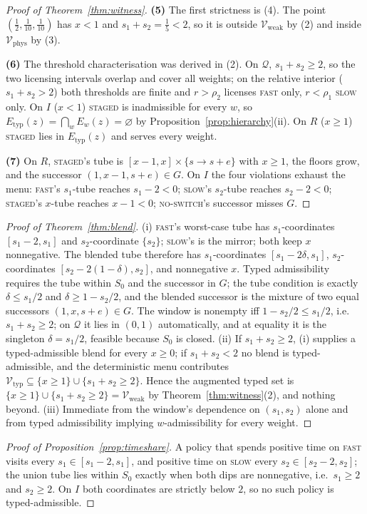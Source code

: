 \documentclass[preprint,11pt,authoryear]{elsarticle}
\theoremstyle{definition}
\theoremstyle{remark}
\newcommand{\Etyp}{E_{\mathrm{typ}}}
\newcommand{\Vtyp}{\mathcal{V}_{\mathrm{typ}}}
\newcommand{\Vweak}{\mathcal{V}_{\mathrm{weak}}}
\newcommand{\Vphys}{\mathcal{V}_{\mathrm{phys}}}
\newcommand{\Q}{\mathcal{Q}}
\newcommand{\act}[1]{\textsc{#1}}
\begin{document}
\begin{proof}[Proof of Theorem~\ref{thm:witness}]
\textbf{(5)} The first strictness is (4). The point $(\tfrac12,\tfrac1{10},\tfrac1{10})$ has $x<1$ and $s_1+s_2=\tfrac15<2$, so it is outside $\Vweak$ by (2) and inside $\Vphys$ by (3).

\textbf{(6)} The threshold characterisation was derived in (2). On $\Q$, $s_1+s_2\ge2$, so the two licensing intervals overlap and cover all weights; on the relative interior ($s_1+s_2>2$) both thresholds are finite and $r>\rho_2$ licenses \act{fast} only, $r<\rho_1$ \act{slow} only. On $I$ ($x<1$) \act{staged} is inadmissible for every $w$, so $\Etyp(z)=\bigcap_wE_w(z)=\varnothing$ by Proposition~\ref{prop:hierarchy}(ii). On $R$ ($x\ge1$) \act{staged} lies in $\Etyp(z)$ and serves every weight.

\textbf{(7)} On $R$, \act{staged}'s tube is $[x-1,x]\times\{s\to s+e\}$ with $x\ge1$, the floors grow, and the successor $(1,x-1,s+e)\in G$. On $I$ the four violations exhaust the menu: \act{fast}'s $s_1$-tube reaches $s_1-2<0$; \act{slow}'s $s_2$-tube reaches $s_2-2<0$; \act{staged}'s $x$-tube reaches $x-1<0$; \act{no-switch}'s successor misses $G$.
\end{proof}

\begin{proof}[Proof of Theorem~\ref{thm:blend}]
(i) \act{fast}'s worst-case tube has $s_1$-coordinates $[s_1-2,s_1]$ and $s_2$-coordinate $\{s_2\}$; \act{slow}'s is the mirror; both keep $x$ nonnegative. The blended tube therefore has $s_1$-coordinates $[s_1-2\delta,s_1]$, $s_2$-coordinates $[s_2-2(1-\delta),s_2]$, and nonnegative $x$. Typed admissibility requires the tube within $S_0$ and the successor in $G$; the tube condition is exactly $\delta\le s_1/2$ and $\delta\ge1-s_2/2$, and the blended successor is the mixture of two equal successors $(1,x,s+e)\in G$. The window is nonempty iff $1-s_2/2\le s_1/2$, i.e.\ $s_1+s_2\ge2$; on $\Q$ it lies in $(0,1)$ automatically, and at equality it is the singleton $\delta=s_1/2$, feasible because $S_0$ is closed.
(ii) If $s_1+s_2\ge2$, (i) supplies a typed-admissible blend for every $x\ge0$; if $s_1+s_2<2$ no blend is typed-admissible, and the deterministic menu contributes $\Vtyp\subseteq\{x\ge1\}\cup\{s_1+s_2\ge2\}$. Hence the augmented typed set is $\{x\ge1\}\cup\{s_1+s_2\ge2\}=\Vweak$ by Theorem~\ref{thm:witness}(2), and nothing beyond.
(iii) Immediate from the window's dependence on $(s_1,s_2)$ alone and from typed admissibility implying $w$-admissibility for every weight.
\end{proof}

\begin{proof}[Proof of Proposition~\ref{prop:timeshare}]
A policy that spends positive time on \act{fast} visits every $s_1\in[s_1-2,s_1]$, and positive time on \act{slow} every $s_2\in[s_2-2,s_2]$; the union tube lies within $S_0$ exactly when both dips are nonnegative, i.e.\ $s_1\ge2$ and $s_2\ge2$. On $I$ both coordinates are strictly below $2$, so no such policy is typed-admissible.
\end{proof}
\end{document}
